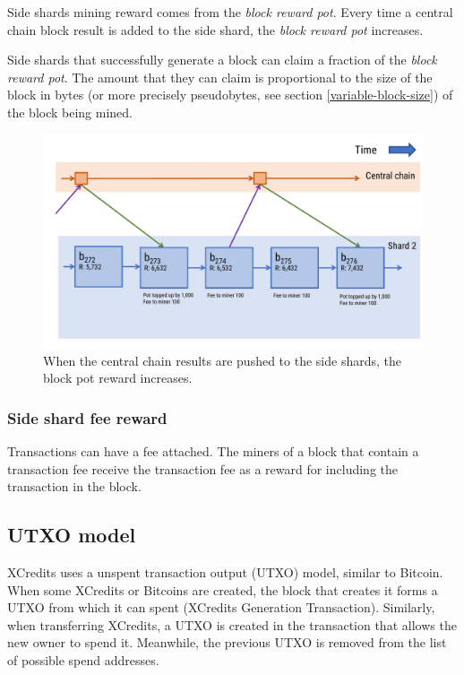 \documentclass[a4paper,12pt]{article}
\begin{document}
Side shards mining reward comes from the \textit{block reward pot}. Every time a central chain block result is added to the side shard, the \textit{block reward pot} increases. 

Side shards that successfully generate a block can claim a fraction of the \textit{block reward pot}. The amount that they can claim is proportional to the size of the block in bytes (or more precisely pseudobytes, see section \ref{variable-block-size}) of the block being mined. 

\begin{figure}[!htb]
  \centering
  \includegraphics[page=1,width=.95\textwidth]{central-chain-pot-reward} 
  \caption{When the central chain results are pushed to the side shards, the block pot reward increases.}
  \label{fig:central-chain-pot-reward}
\end{figure}
\FloatBarrier

\subsubsection{Side shard fee reward}
Transactions can have a fee attached. The miners of a block that contain a transaction fee receive the transaction fee as a reward for including the transaction in the block.


\subsection{UTXO model}
XCredits uses a unspent transaction output (UTXO) model, similar to Bitcoin. When some XCredits or Bitcoins are created, the block that creates it forms a UTXO from which it can spent (XCredits Generation Transaction). Similarly, when transferring XCredits, a UTXO is created in the transaction that allows the new owner to spend it. Meanwhile, the previous UTXO is removed from the list of possible spend addresses.
\end{document}
